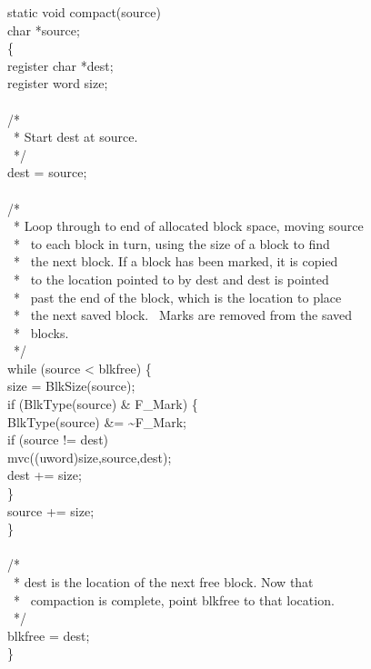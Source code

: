 \begin{iconcode}
static void compact(source)\\
char *source;\\
\{\\
\>register char *dest;\\
\>register word size;\\
\\
\>/*\\
\>\ * Start dest at source.\\
\>\ */\\
\>dest = source;\\
\\
\>/*\\
\>\ * Loop through to end of allocated block space, moving source\\
\>\ * \ to each block in turn, using the size of a block to find\\
\>\ * \ the next block. If a block has been marked, it is copied\\
\>\ * \ to the location pointed to by dest and dest is pointed\\
\>\ * \ past the end of the block, which is the location to place\\
\>\ * \ the next saved block. \ Marks are removed from the saved\\
\>\ * \ blocks.\\
\>\ */\\
\>while (source < blkfree) \{\\
\>\>size = BlkSize(source);\\
\>\>if (BlkType(source) \& F\_Mark) \{\\
\>\>\>BlkType(source) \&= \~{}F\_Mark;\\
\>\>\>if (source != dest)\\
\>\>\>\>mvc((uword)size,source,dest);\\
\>\>\>dest += size;\\
\>\>\>\}\\
\>\>source += size;\\
\>\>\}\\
\\
\>/*\\
\>\ * dest is the location of the next free block. Now that\\
\>\ * \ compaction is complete, point blkfree to that location.\\
\>\ */\\
\>blkfree = dest;\\
\}
\end{iconcode}

